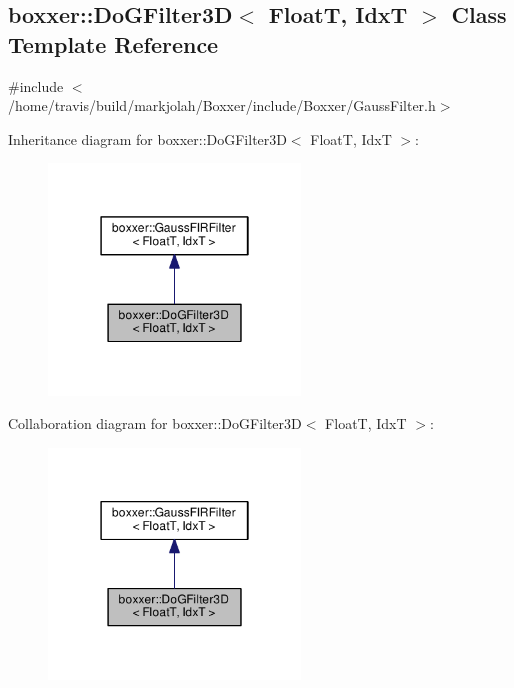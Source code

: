 \hypertarget{classboxxer_1_1DoGFilter3D}{}\subsection{boxxer\+:\+:Do\+G\+Filter3D$<$ FloatT, IdxT $>$ Class Template Reference}
\label{classboxxer_1_1DoGFilter3D}


{\ttfamily \#include $<$/home/travis/build/markjolah/\+Boxxer/include/\+Boxxer/\+Gauss\+Filter.\+h$>$}



Inheritance diagram for boxxer\+:\+:Do\+G\+Filter3D$<$ FloatT, IdxT $>$\+:\nopagebreak
\begin{figure}[H]
\begin{center}
\leavevmode
\includegraphics[width=190pt]{classboxxer_1_1DoGFilter3D__inherit__graph}
\end{center}
\end{figure}


Collaboration diagram for boxxer\+:\+:Do\+G\+Filter3D$<$ FloatT, IdxT $>$\+:\nopagebreak
\begin{figure}[H]
\begin{center}
\leavevmode
\includegraphics[width=190pt]{classboxxer_1_1DoGFilter3D__coll__graph}
\end{center}
\end{figure}
